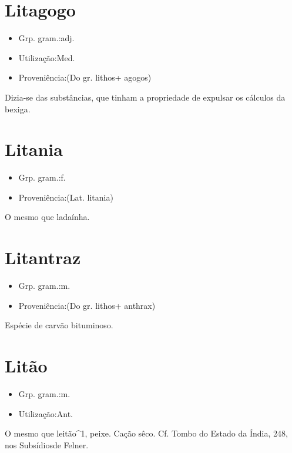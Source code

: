 \section{Litagogo}
\begin{itemize}
\item {Grp. gram.:adj.}
\end{itemize}
\begin{itemize}
\item {Utilização:Med.}
\end{itemize}
\begin{itemize}
\item {Proveniência:(Do gr. \textunderscore lithos\textunderscore  + \textunderscore agogos\textunderscore )}
\end{itemize}
Dizia-se das substâncias, que tinham a propriedade de expulsar os cálculos da bexiga.
\section{Litania}
\begin{itemize}
\item {Grp. gram.:f.}
\end{itemize}
\begin{itemize}
\item {Proveniência:(Lat. \textunderscore litania\textunderscore )}
\end{itemize}
O mesmo que \textunderscore ladaínha\textunderscore .
\section{Litantraz}
\begin{itemize}
\item {Grp. gram.:m.}
\end{itemize}
\begin{itemize}
\item {Proveniência:(Do gr. \textunderscore lithos\textunderscore  + \textunderscore anthrax\textunderscore )}
\end{itemize}
Espécie de carvão bituminoso.
\section{Litão}
\begin{itemize}
\item {Grp. gram.:m.}
\end{itemize}
\begin{itemize}
\item {Utilização:Ant.}
\end{itemize}
O mesmo que \textunderscore leitão\textunderscore ^1, peixe.
Cação sêco. Cf. \textunderscore Tombo do Estado da Índia\textunderscore , 248, nos \textunderscore Subsídios\textunderscore  de Felner.
